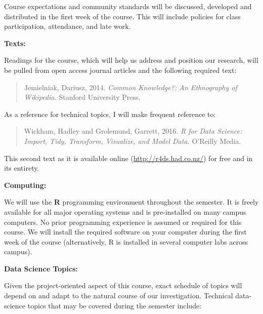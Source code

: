 \documentclass[12pt]{article}
\begin{document}
Course expectations and community standards will be discussed, developed and
distributed in the first week of the course. This will include policies for
class participation, attendance, and late work.

\vspace{0.5cm}

\textbf{Texts:} \vspace{6pt}

Readings for the course, which will help us address and position our research,
will be pulled from open access journal articles and the following required
text:

\begin{quote}
Jemielniak, Dariusz, 2014. \textit{Common Knowledge?: An Ethnography
of Wikipedia.} Stanford University Press.
\end{quote}

As a reference for technical topics, I will make frequent reference to:

\begin{quote}
Wickham, Hadley and Grolemund, Garrett, 2016.
\textit{R for Data Science: Import, Tidy, Transform, Visualize, and Model
Data.} O'Reilly Media.
\end{quote}

This second text as it is available online
(\url{http://r4ds.had.co.nz/}) for free and in its entirety.

\vspace{0.5cm}

\textbf{Computing:} \vspace{6pt}

We will use the \textbf{R} programming environment throughout the
semester. It is freely available for all major operating systems and
is pre-installed on many campus computers. No prior programming experience is
assumed or required for this course. We will install the required software
on your computer during the first week of the course (alternatively, R is
installed in several computer labs across campus).

\vspace{0.5cm}

\textbf{Data Science Topics:} \vspace{6pt}

Given the project-oriented aspect of this course, exact schedule of topics
will depend on and adapt to the natural course of our investigation. Technical
data-science topics that may be covered during the semester include:
\end{document}
